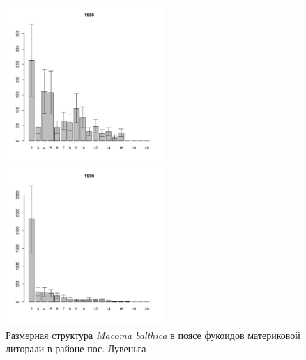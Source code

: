 \begin{figure}[hp]
	\begin{minipage}[b]{.3\linewidth}
	\begin{center}
	\includegraphics[width=60mm]{../White_Sea/Luvenga_II_razrez/fucus_zone2_1995_.pdf}
	\end{center}
	\end{minipage}
	\hfill
	\begin{minipage}[b]{.3\linewidth}
	\begin{center}
	\includegraphics[width=60mm]{../White_Sea/Luvenga_II_razrez/fucus_zone2_1999_.pdf}
	\end{center}
	\end{minipage}
	\hfill
	\begin{minipage}[b]{.3\linewidth}
	\begin{center}

	\end{center}
	\end{minipage}
\caption{Размерная структура {\it Macoma balthica} в поясе фукоидов материковой литорали в районе пос. Лувеньга}
\label{ris:size_str_2razrez_fucus}
\end{figure}


